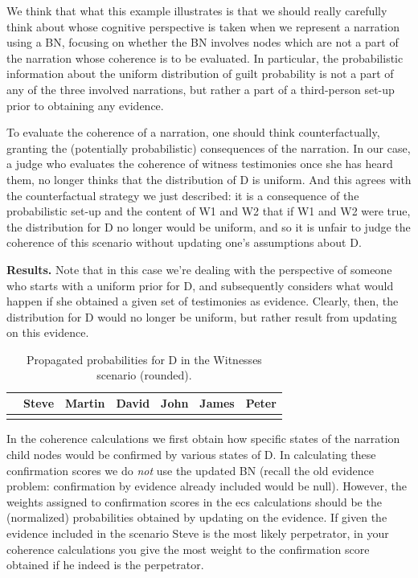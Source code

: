 \documentclass[
  10pt,
]{scrartcl}
\newcommand{\s}[1]{\textsf{#1}}
\begin{document}
We think that what this example illustrates is that we should really carefully think about whose cognitive perspective is taken when we represent a narration using a BN, focusing on whether the BN involves nodes which are not a part of the narration whose coherence is to be evaluated. In particular, the probabilistic information about the uniform distribution of guilt probability is not a part of any of the three involved narrations, but rather a part of a third-person set-up prior to obtaining any evidence.

To evaluate the coherence of a narration, one should think counterfactually, granting the (potentially probabilistic) consequences of the narration. In our case, a judge who evaluates the coherence of witness testimonies once she has heard them, no longer thinks that the distribution of \textsf{D} is uniform. And this agrees with the counterfactual strategy we just described: it is a consequence of the probabilistic set-up and the content of \textsf{W1} and \textsf{W2} that if \textsf{W1} and \textsf{W2} were true, the distribution for \textsf{D} no longer would be uniform, and so it is unfair to judge the coherence of this scenario without updating one's assumptions about \textsf{D}.

\textbf{Results.} Note that in this case we're dealing with the perspective of someone who starts with a uniform prior for \s{D}, and subsequently considers what would happen if she obtained a given set of testimonies as evidence. Clearly, then, the distribution for \s{D} would no longer be uniform, but rather result from updating on this evidence.

\begin{table}[H]

\caption{\label{tab:witnessesWeights}Propagated probabilities for D in the Witnesses scenario (rounded).}
\centering
\begin{tabular}[t]{lrrrrrr}
\toprule
  & Steve & Martin & David & John & James & Peter\\
\midrule
\cellcolor{gray!6}{Pr} & \cellcolor{gray!6}{0.981} & \cellcolor{gray!6}{0.004} & \cellcolor{gray!6}{0.004} & \cellcolor{gray!6}{0.004} & \cellcolor{gray!6}{0.004} & \cellcolor{gray!6}{0.004}\\
\bottomrule
\end{tabular}
\end{table}

In the coherence calculations we first obtain how specific states of the narration child nodes would be confirmed by various states of \s{D}. In calculating these confirmation scores we do \emph{not} use the updated BN (recall the old evidence problem: confirmation by evidence already included would be null). However, the weights assigned to confirmation scores in the \s{ecs} calculations should be the (normalized) probabilities obtained by updating on the evidence. If given the evidence included in the scenario Steve is the most likely perpetrator, in your coherence calculations you give the most weight to the confirmation score obtained if he indeed is the perpetrator.
\end{document}
